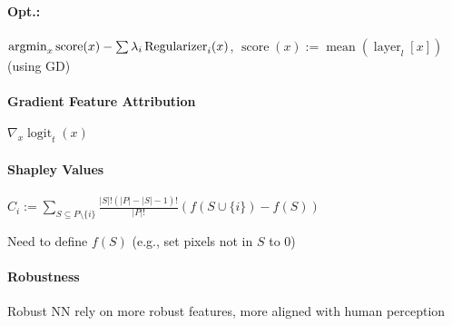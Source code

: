 \paragraph{Opt.:}
$\operatorname*{argmin}_x \operatorname{score}(x) - \sum \lambda_i \operatorname{Regularizer}_i(x)$, $\operatorname{score}(x) := \operatorname{mean}(\operatorname{layer}_l[x])$ (using GD)

\paragraph{Gradient Feature Attribution}
$\nabla_x \operatorname{logit}_t(x)$

\paragraph{Shapley Values}
$\displaystyle C_i := \sum_{S \subseteq P \setminus \{i\}} \frac{\lvert S \rvert! (\lvert P\rvert - \lvert S \rvert - 1) !}{\lvert P \rvert !} \left(f(S \cup \{i\}) - f(S) \right)$

Need to define $f(S)$ (e.g., set pixels not in $S$ to 0)

\paragraph{Robustness} Robust NN rely on more robust features, more aligned with human perception